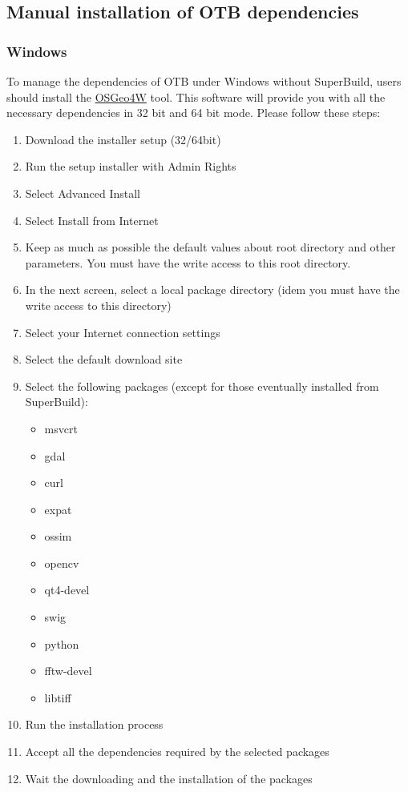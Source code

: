 \subsection{Manual installation of OTB dependencies}
\label{sec:manualdependencies}

\subsubsection{Windows}

To manage the dependencies of OTB under Windows without SuperBuild, users should install the \href{http://trac.osgeo.org/osgeo4w/}{OSGeo4W} tool. This software will provide you with all the necessary dependencies in 32 bit and 64 bit mode. Please follow these steps:
\begin{enumerate}
\item  Download the installer setup (32/64bit)
\item  Run the setup installer with Admin Rights
\item  Select Advanced Install
\item  Select Install from Internet
\item  Keep as much as possible the default values about root directory and other parameters. You must have the write access to this root directory. 
\item  In the next screen, select a local package directory (idem you must have the write access to this directory)
\item  Select your Internet connection settings
\item  Select the default download site
\item  Select the following packages (except for those eventually installed from SuperBuild):
	\begin{itemize}
	\item  msvcrt
	\item  gdal
	\item  curl
	\item  expat 
	\item  ossim
	\item  opencv
	\item  qt4-devel
	\item  swig
	\item  python
	\item  fftw-devel
	\item  libtiff
	\end{itemize}
\item  Run the installation process
\item  Accept all the dependencies required by the selected packages
\item  Wait the downloading and the installation of the packages
\end{enumerate}

